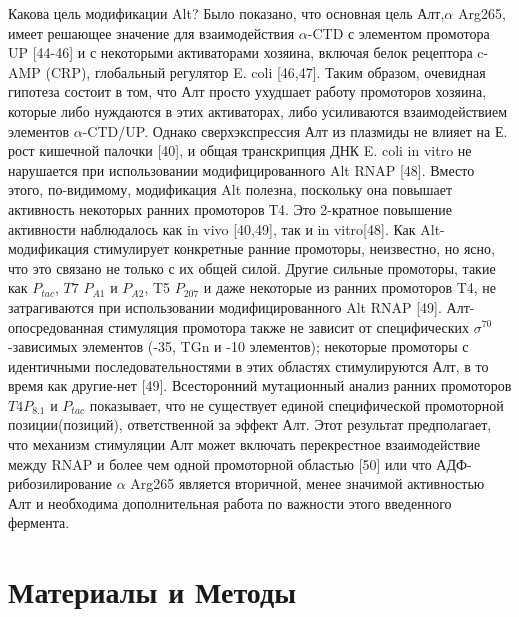 \documentclass[a4paper,12pt]{article}
\begin{document}
            \par{Какова цель модификации Alt? Было показано, что основная цель Алт,\(\alpha\) Arg265, имеет решающее
            значение для взаимодействия \(\alpha\)-CTD с элементом промотора UP [44-46] и с некоторыми активаторами
            хозяина, включая белок рецептора c-AMP (CRP), глобальный регулятор E. coli [46,47]. Таким образом, очевидная
            гипотеза состоит в том, что Алт просто ухудшает работу промоторов хозяина, которые либо нуждаются в этих
            активаторах, либо усиливаются взаимодействием элементов \(\alpha\)-CTD/UP. Однако сверхэкспрессия Алт из
            плазмиды не влияет на Е. рост кишечной палочки [40], и общая транскрипция ДНК E. coli in vitro не нарушается
            при использовании модифицированного Alt RNAP [48]. Вместо этого, по-видимому, модификация Alt полезна,
            поскольку она повышает активность некоторых ранних промоторов Т4. Это 2-кратное повышение активности
            наблюдалось как in vivo [40,49], так и in vitro[48]. Как Alt-модификация стимулирует конкретные ранние
            промоторы, неизвестно, но ясно, что это связано не только с их общей силой. Другие сильные промоторы, такие
            как \(P_{tac}\), \(T7\) \(P_{A1}\) и \(P_{A2}\), T5 \(P_{207}\) и даже некоторые из ранних промоторов T4, не
            затрагиваются при использовании модифицированного Alt RNAP [49]. Алт-опосредованная стимуляция промотора
            также не зависит от специфических \(\sigma^{70}\)-зависимых элементов (-35, TGn и -10 элементов); некоторые
            промоторы с идентичными последовательностями в этих областях стимулируются Алт, в то время как другие-нет
            [49]. Всесторонний мутационный анализ ранних промоторов \(T4 P_{8.1}\) и \(P_{tac}\) показывает, что не
            существует единой специфической промоторной позиции(позиций), ответственной за эффект Алт. Этот результат
            предполагает, что механизм стимуляции Алт может включать перекрестное взаимодействие между RNAP и более чем
            одной промоторной областью [50] или что АДФ-рибозилирование $ \alpha $ Arg265 является вторичной, менее
            значимой активностью Алт и необходима дополнительная работа по важности этого введенного фермента.}

\newpage
\section{Материалы и Методы} \label{sec:code}
\end{document}

